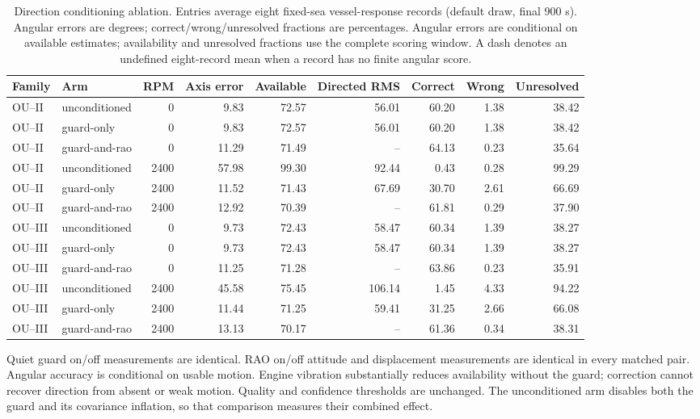 \begin{table}[t]\centering\footnotesize
\caption{Direction conditioning ablation. Entries average eight fixed-sea vessel-response records
(default draw, final 900 s). Angular errors are degrees; correct/wrong/unresolved
fractions are percentages. Angular errors are conditional on available estimates;
availability and unresolved fractions use the complete scoring window.
A dash denotes an undefined eight-record mean when a record has no finite angular score.}
\label{tab:direction-rao-ablation}
\begin{tabular}{@{}llrrrrrrr@{}}\toprule
Family & Arm & RPM & Axis error & Available & Directed RMS & Correct & Wrong & Unresolved \\
\midrule
OU--II & unconditioned & 0 & 9.83 & 72.57 & 56.01 & 60.20 & 1.38 & 38.42 \\
OU--II & guard-only & 0 & 9.83 & 72.57 & 56.01 & 60.20 & 1.38 & 38.42 \\
OU--II & guard-and-rao & 0 & 11.29 & 71.49 & -- & 64.13 & 0.23 & 35.64 \\
OU--II & unconditioned & 2400 & 57.98 & 99.30 & 92.44 & 0.43 & 0.28 & 99.29 \\
OU--II & guard-only & 2400 & 11.52 & 71.43 & 67.69 & 30.70 & 2.61 & 66.69 \\
OU--II & guard-and-rao & 2400 & 12.92 & 70.39 & -- & 61.81 & 0.29 & 37.90 \\
OU--III & unconditioned & 0 & 9.73 & 72.43 & 58.47 & 60.34 & 1.39 & 38.27 \\
OU--III & guard-only & 0 & 9.73 & 72.43 & 58.47 & 60.34 & 1.39 & 38.27 \\
OU--III & guard-and-rao & 0 & 11.25 & 71.28 & -- & 63.86 & 0.23 & 35.91 \\
OU--III & unconditioned & 2400 & 45.58 & 75.45 & 106.14 & 1.45 & 4.33 & 94.22 \\
OU--III & guard-only & 2400 & 11.44 & 71.25 & 59.41 & 31.25 & 2.66 & 66.08 \\
OU--III & guard-and-rao & 2400 & 13.13 & 70.17 & -- & 61.36 & 0.34 & 38.31 \\
\bottomrule\end{tabular}\end{table}
Quiet guard on/off measurements are identical. RAO on/off attitude and displacement measurements are identical in every matched pair. Angular accuracy is conditional on usable motion. Engine vibration substantially reduces availability without the guard; correction cannot recover direction from absent or weak motion. Quality and confidence thresholds are unchanged. The unconditioned arm disables both the guard and its covariance inflation, so that comparison measures their combined effect.
